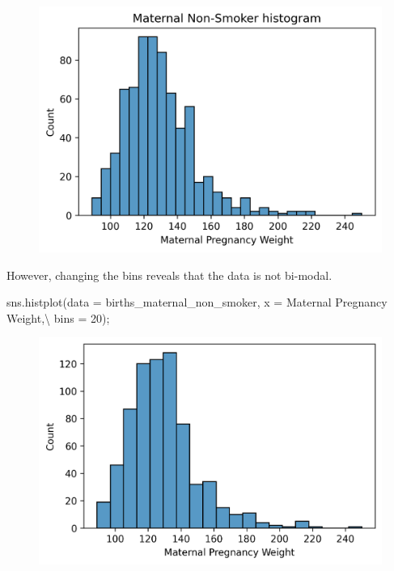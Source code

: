 \documentclass[
  letterpaper,
  DIV=11,
  numbers=noendperiod]{scrreprt}
\newenvironment{Shaded}{\begin{snugshade}}{\end{snugshade}}
\newcommand{\DecValTok}[1]{\textcolor[rgb]{0.68,0.00,0.00}{#1}}
\newcommand{\NormalTok}[1]{\textcolor[rgb]{0.00,0.23,0.31}{#1}}
\newcommand{\OperatorTok}[1]{\textcolor[rgb]{0.37,0.37,0.37}{#1}}
\newcommand{\StringTok}[1]{\textcolor[rgb]{0.13,0.47,0.30}{#1}}
\begin{document}
\begin{figure}[H]

{\centering \includegraphics{visualization_1/visualization_1_files/figure-pdf/cell-14-output-1.png}

}

\end{figure}

However, changing the bins reveals that the data is not bi-modal.

\begin{Shaded}
\begin{Highlighting}[]
\NormalTok{sns.histplot(data }\OperatorTok{=}\NormalTok{ births\_maternal\_non\_smoker, x }\OperatorTok{=} \StringTok{\textquotesingle{}Maternal Pregnancy Weight\textquotesingle{}}\NormalTok{,}\OperatorTok{\textbackslash{}}
\NormalTok{             bins }\OperatorTok{=} \DecValTok{20}\NormalTok{)}\OperatorTok{;}
\end{Highlighting}
\end{Shaded}

\begin{figure}[H]

{\centering \includegraphics{visualization_1/visualization_1_files/figure-pdf/cell-15-output-1.png}

}

\end{figure}
\end{document}
